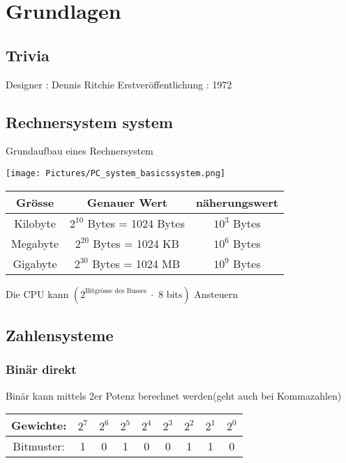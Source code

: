 
\section{Grundlagen}

\subsection{Trivia}

Designer : Dennis Ritchie \newline
Erstveröffentlichung : 1972

\subsection{Rechnersystem system}

Grundaufbau eines Rechnersystem

\texttt{[image: Pictures/PC\_system\_basicssystem.png]}

\begin{center}
    \begin{tabular}{|c|c|c|} \hline  
        Grösse & Genauer Wert & näherungswert \\ \hline  
        Kilobyte & $2^{10}$ Bytes = 1024 Bytes & $10^3$ Bytes \\ \hline  
        Megabyte & $2^{20}$ Bytes = 1024 KB & $10^6$ Bytes \\ \hline  
        Gigabyte & $2^{30}$ Bytes = 1024 MB & $10^9$ Bytes \\ \hline 
    \end{tabular}
\end{center}

Die CPU kann $(2^{\text{Bitgrösse des Busses }} \cdot \text{ 8 bits})$ Ansteuern

\subsection{Zahlensysteme}

\subsubsection{Binär direkt}

Binär kann mittels 2er Potenz berechnet werden(geht auch bei Kommazahlen)\newline

\noindent
\begin{tabular}{|c|c|c|c|c|c|c|c|c|}
\hline
Gewichte: & \(2^7\) & \(2^6\) & \(2^5\) & \(2^4\) & \(2^3\) & \(2^2\) & \(2^1\) & \(2^0\) \\
\hline
Bitmuster: & 1 & 0 & 1 & 0 & 0 & 1 & 1 & 0 \\
\hline
\end{tabular}

